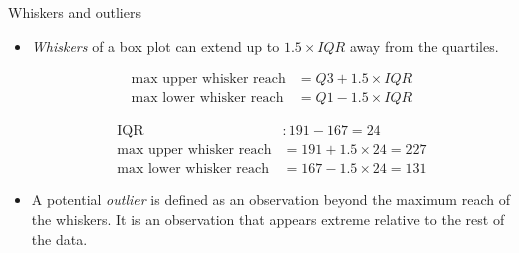 \documentclass[notes,11pt, aspectratio=169]{beamer}
\newcommand{\formula}[1]{
\begin{beamerboxesrounded}[shadow = false, lower = formula body]{}
#1
\end{beamerboxesrounded}
}
\newcommand{\hl}[1]{\textit{\textcolor{hlblue}{#1}}}
\begin{document}
\begin{frame}[fragile]{Whiskers and outliers}
\begin{itemize}
\item \hl{Whiskers} of a box plot can extend up to $1.5 \times IQR$ away from the quartiles.
\formula{
\vspace{-0.5cm}
\begin{align*} 
\text{max~upper~whisker~reach} &= Q3 + 1.5 \times IQR \\
\text{max~lower~whisker~reach} &= Q1 - 1.5 \times IQR
\end{align*}
}
\pause
\vspace{-0.5cm}
{\small
\begin{align*}
\text{IQR}&: 191 - 167 = 24 \\
\text{max~upper~whisker~reach}&= 191 + 1.5\times 24 = 227 \\
\text{max~lower~whisker~reach}&= 167 - 1.5\times 24 = 131
\end{align*}
}

\pause
\vspace{-0.25cm}
\item A potential \hl{outlier} is defined as an observation beyond the maximum reach of the whiskers. It is an observation that appears extreme relative to the rest of the data.
\end{itemize}
\end{frame}
\end{document}
